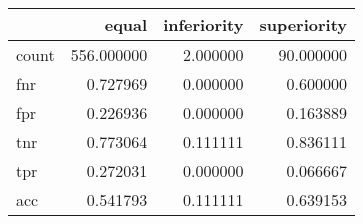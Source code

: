 \begin{tabular}{lrrr}
\toprule
{} &       equal &  inferiority &  superiority \\
\midrule
count &  556.000000 &     2.000000 &    90.000000 \\
fnr   &    0.727969 &     0.000000 &     0.600000 \\
fpr   &    0.226936 &     0.000000 &     0.163889 \\
tnr   &    0.773064 &     0.111111 &     0.836111 \\
tpr   &    0.272031 &     0.000000 &     0.066667 \\
acc   &    0.541793 &     0.111111 &     0.639153 \\
\bottomrule
\end{tabular}
